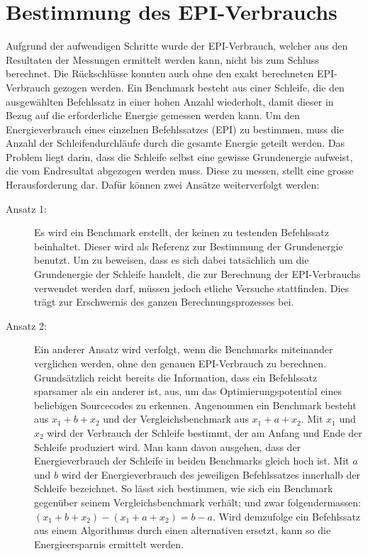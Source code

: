\section{Bestimmung des EPI-Verbrauchs}
\label{sec:bestimmung_grundenergie}

Aufgrund der aufwendigen Schritte wurde der EPI-Verbrauch, welcher aus den Resultaten der Messungen ermittelt werden kann, nicht bis zum Schluss berechnet. Die Rückschlüsse konnten auch ohne den exakt berechneten EPI-Verbrauch gezogen werden. Ein Benchmark besteht aus einer Schleife, die den ausgewählten Befehlssatz in einer hohen Anzahl wiederholt, damit dieser in Bezug auf die erforderliche Energie gemessen werden kann. Um den Energieverbrauch eines einzelnen Befehlssatzes (EPI) zu bestimmen, muss die Anzahl der Schleifendurchläufe durch die gesamte Energie geteilt werden. Das Problem liegt darin, dass die Schleife selbst eine gewisse Grundenergie aufweist, die vom Endresultat abgezogen werden muss. Diese zu messen, stellt eine grosse Herausforderung dar. Dafür können zwei Ansätze weiterverfolgt werden:
\begin{description}
\item[Ansatz 1:]
Es wird ein Benchmark erstellt, der keinen zu testenden Befehlssatz beinhaltet. Dieser wird als Referenz zur Bestimmung der Grundenergie benutzt. Um zu beweisen, dass es sich dabei tatsächlich um die Grundenergie der Schleife handelt, die zur Berechnung der EPI-Verbrauchs verwendet werden darf, müssen jedoch etliche Versuche stattfinden. Dies trägt zur Erschwernis des ganzen Berechnungsprozesses bei. 
\par
\item[Ansatz 2:]
Ein anderer Ansatz wird verfolgt, wenn die Benchmarks miteinander verglichen werden, ohne den genauen EPI-Verbrauch zu berechnen. Grundsätzlich reicht bereits die Information, dass ein Befehlssatz sparsamer als ein anderer ist, aus, um das Optimierungspotential eines beliebigen Sourcecodes zu erkennen. Angenommen ein Benchmark besteht aus $x_1 + b + x_2$ und der Vergleichsbenchmark aus $x_1 + a + x_2$. Mit $x_1$ und $x_2$ wird der Verbrauch der Schleife bestimmt, der am Anfang und Ende der Schleife produziert wird. Man kann davon ausgehen, dass der Energieverbrauch der Schleife in beiden Benchmarks gleich hoch ist. Mit $a$ und $b$ wird der Energieverbrauch des jeweiligen Befehlssatzes innerhalb der Schleife bezeichnet. So lässt sich bestimmen, wie sich ein Benchmark gegenüber seinem Vergleichsbenchmark verhält; und zwar folgendermassen: $(x_1 + b + x_2) - (x_1 + a + x_2) = b - a$. Wird demzufolge ein Befehlssatz aus einem Algorithmus durch einen alternativen ersetzt, kann so die Energieersparnis ermittelt werden.
\end{description}


